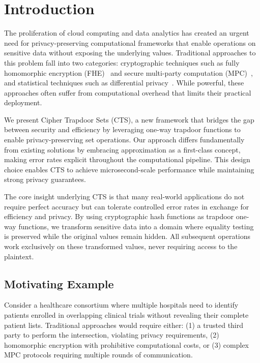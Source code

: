 \documentclass[10pt,conference]{IEEEtran}
\begin{document}
\section{Introduction}

The proliferation of cloud computing and data analytics has created an urgent need for privacy-preserving computational frameworks that enable operations on sensitive data without exposing the underlying values. Traditional approaches to this problem fall into two categories: cryptographic techniques such as fully homomorphic encryption (FHE)~\cite{gentry2009fully} and secure multi-party computation (MPC)~\cite{yao1982protocols}, and statistical techniques such as differential privacy~\cite{dwork2006calibrating}. While powerful, these approaches often suffer from computational overhead that limits their practical deployment.

We present Cipher Trapdoor Sets (CTS), a new framework that bridges the gap between security and efficiency by leveraging one-way trapdoor functions to enable privacy-preserving set operations. Our approach differs fundamentally from existing solutions by embracing approximation as a first-class concept, making error rates explicit throughout the computational pipeline. This design choice enables CTS to achieve microsecond-scale performance while maintaining strong privacy guarantees.

The core insight underlying CTS is that many real-world applications do not require perfect accuracy but can tolerate controlled error rates in exchange for efficiency and privacy. By using cryptographic hash functions as trapdoor one-way functions, we transform sensitive data into a domain where equality testing is preserved while the original values remain hidden. All subsequent operations work exclusively on these transformed values, never requiring access to the plaintext.

\subsection{Motivating Example}

Consider a healthcare consortium where multiple hospitals need to identify patients enrolled in overlapping clinical trials without revealing their complete patient lists. Traditional approaches would require either: (1) a trusted third party to perform the intersection, violating privacy requirements, (2) homomorphic encryption with prohibitive computational costs, or (3) complex MPC protocols requiring multiple rounds of communication.
\end{document}
